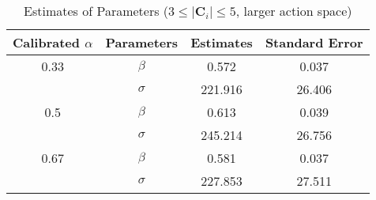 \begin{table}[H]
    \centering
    \caption{Estimates of Parameters ($3 \leq |\mathbf{C}_i| \leq 5$, larger action space)}
    \label{table: estimates (min_size=3 max_size=5 margin=3000)}
    \begin{tabular}{cccc}
        \toprule
        Calibrated $\alpha$ & Parameters & Estimates & Standard Error \\
        \midrule
        0.33                & $\beta$    & 0.572     & 0.037          \\
                            & $\sigma$   & 221.916   & 26.406         \\
        \midrule
        0.5                 & $\beta$    & 0.613     & 0.039          \\
                            & $\sigma$   & 245.214   & 26.756         \\
        \midrule
        0.67                & $\beta$    & 0.581     & 0.037          \\
                            & $\sigma$   & 227.853   & 27.511         \\
        \bottomrule
    \end{tabular}
\end{table}
